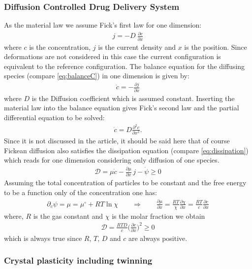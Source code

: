 \subsubsection{Diffusion Controlled Drug Delivery System}

As the material law we assume Fick's first law for one dimension:
\begin{align}
  j = -D \ \frac{\partial c}{\partial x} 
\end{align}
where $c$ is the concentration, $j$ is the current density and $x$ is the position. Since deformations are not considered in this case the current configuration is equivalent to the reference configuration. The balance equation for the diffusing species (compare \cref{eq:balanceC}) in one dimension is given by:
\begin{align}
  \dot c = - \frac{\partial j}{\partial x}
\end{align}
where $D$ is the Diffusion coefficient which is assumed constant. Inserting the material law into the balance equation gives Fick's second law and the partial differential equation to be solved: 
\begin{align}
  \dot c = D \frac{\partial^2 c}{\partial x^2}.
\end{align}
Since it is not discussed in the article, it should be said here that of course Fickean diffusion also satisfies the dissipation equation (compare \cref{eq:dissipation}) which reads for one dimension considering only diffusion of one species.
\begin{align}
  \mathcal{D} = \mu \dot c - \frac{\partial \mu}{\partial x} \, j - \dot \psi \geq 0
\end{align} 
Assuming the total concentration of particles to be constant and the free energy to be a function only of the concentration one has:
\begin{align}
  \partial_c \psi = \mu = \mu^{\circ} + R T \ln{\chi} \qquad \Rightarrow \qquad \frac{\partial \mu}{\partial x} = \frac{R T}{\chi} \frac{\partial \chi}{\partial x} = \frac{RT}{c} \frac{\partial c}{\partial x}
\end{align}
where, $R$ is the gas constant and $\chi$ is the molar fraction we obtain
\begin{align}
  \mathcal{D} = \frac{RTD}{c} \bigg(\frac{\partial c}{\partial x}\bigg)^2 \geq 0
\end{align}
which is always true since $R$, $T$, $D$ and $c$ are always positive.

\subsubsection{Crystal plasticity including twinning}

